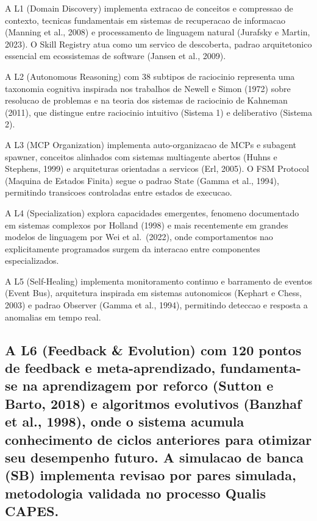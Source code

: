 \documentclass[
  12pt,
]{article}
\begin{document}
A L1 (Domain Discovery) implementa extracao de conceitos e compressao de
contexto, tecnicas fundamentais em sistemas de recuperacao de informacao
(Manning et al., 2008) e processamento de linguagem natural (Jurafsky e
Martin, 2023). O Skill Registry atua como um servico de descoberta,
padrao arquitetonico essencial em ecossistemas de software (Jansen et
al., 2009).

A L2 (Autonomous Reasoning) com 38 subtipos de raciocinio representa uma
taxonomia cognitiva inspirada nos trabalhos de Newell e Simon (1972)
sobre resolucao de problemas e na teoria dos sistemas de raciocinio de
Kahneman (2011), que distingue entre raciocinio intuitivo (Sistema 1) e
deliberativo (Sistema 2).

A L3 (MCP Organization) implementa auto-organizacao de MCPs e subagent
spawner, conceitos alinhados com sistemas multiagente abertos (Huhns e
Stephens, 1999) e arquiteturas orientadas a servicos (Erl, 2005). O FSM
Protocol (Maquina de Estados Finita) segue o padrao State (Gamma et al.,
1994), permitindo transicoes controladas entre estados de execucao.

A L4 (Specialization) explora capacidades emergentes, fenomeno
documentado em sistemas complexos por Holland (1998) e mais recentemente
em grandes modelos de linguagem por Wei et al.~(2022), onde
comportamentos nao explicitamente programados surgem da interacao entre
componentes especializados.

A L5 (Self-Healing) implementa monitoramento continuo e barramento de
eventos (Event Bus), arquitetura inspirada em sistemas autonomicos
(Kephart e Chess, 2003) e padrao Observer (Gamma et al., 1994),
permitindo deteccao e resposta a anomalias em tempo real.

\subsection{A L6 (Feedback \& Evolution) com 120 pontos de feedback e
meta-aprendizado, fundamenta-se na aprendizagem por reforco (Sutton e
Barto, 2018) e algoritmos evolutivos (Banzhaf et al., 1998), onde o
sistema acumula conhecimento de ciclos anteriores para otimizar seu
desempenho futuro. A simulacao de banca (SB) implementa revisao por
pares simulada, metodologia validada no processo Qualis
CAPES.}\label{a-l6-feedback-evolution-com-120-pontos-de-feedback-e-meta-aprendizado-fundamenta-se-na-aprendizagem-por-reforco-sutton-e-barto-2018-e-algoritmos-evolutivos-banzhaf-et-al.-1998-onde-o-sistema-acumula-conhecimento-de-ciclos-anteriores-para-otimizar-seu-desempenho-futuro.-a-simulacao-de-banca-sb-implementa-revisao-por-pares-simulada-metodologia-validada-no-processo-qualis-capes.}
\end{document}
